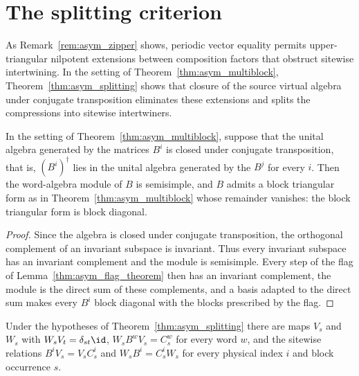 \section{The splitting criterion}%
\label{sec:asym_splitting}

As Remark~\ref{rem:asym_zipper} shows, periodic vector equality permits
upper-triangular nilpotent extensions between composition factors that
obstruct sitewise intertwining. In the setting of
Theorem~\ref{thm:asym_multiblock}, Theorem~\ref{thm:asym_splitting} shows
that closure of the source virtual algebra under conjugate transposition
eliminates these extensions and splits the compressions into sitewise
intertwiners.

\begin{theorem}
    \label{thm:asym_splitting}
    \leanok
    In the setting of Theorem~\ref{thm:asym_multiblock}, suppose that the
    unital algebra generated by the matrices $B^i$ is closed under conjugate
    transposition, that is, $(B^i)^\dagger$ lies in the unital algebra generated
    by the $B^j$ for every $i$. Then the word-algebra module of $B$ is
    semisimple, and $B$ admits a block triangular form as in
    Theorem~\ref{thm:asym_multiblock} whose remainder vanishes: the block
    triangular form is block diagonal.
\end{theorem}

\begin{proof}
    \leanok
    Since the algebra is closed under conjugate transposition, the
    orthogonal complement of an invariant subspace is invariant. Thus
    every invariant subspace has an invariant complement and the module
    is semisimple. Every step of the flag of
    Lemma~\ref{thm:asym_flag_theorem} then has an invariant complement,
    the module is the direct sum of these complements, and a basis
    adapted to the direct sum makes every $B^i$ block diagonal with the
    blocks prescribed by the flag.
\end{proof}

\begin{corollary}
    \label{cor:asym_fusion_tensors_star}
    \leanok
    Under the hypotheses of Theorem~\ref{thm:asym_splitting} there are
    maps $V_s$ and $W_s$ with $W_sV_t=\delta_{st}\id$, $W_sB^wV_s=C_s^w$
    for every word $w$, and the sitewise relations $B^iV_s=V_sC_s^i$ and
    $W_sB^i=C_s^iW_s$ for every physical index $i$ and block occurrence $s$.
\end{corollary}

